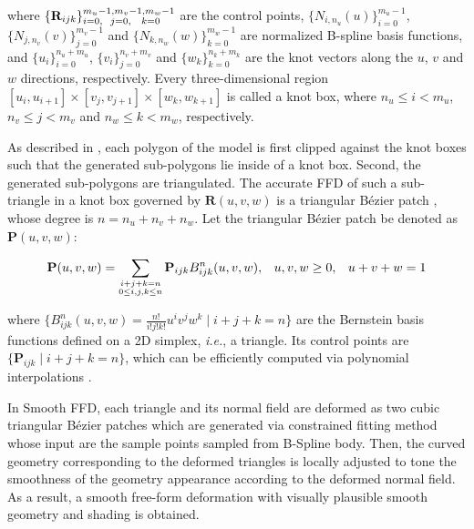 \documentclass[3p]{elsarticle}
\begin{document}
\noindent where $\{\mathbf R_{ijk}\}_{i=0,\hspace{6 pt} j=0,\hspace{8 pt} k=0}^{m_u-1,m_v-1,m_w-1}$ are the control
points, $\{N_{i,n_u}(u)\}_{i=0}^{m_u-1}$, $\{N_{j,n_v}(v)\}_{j=0}^{m_v-1}$ and $\{N_{k,n_w}(w)\}_{k=0}^{m_w-1}$ are
normalized B-spline basis functions, and $\{u_i\}^{n_u+m_u}_{i=0}$, $\{v_i\}^{n_v+m_v}_{j=0}$ and
$\{w_k\}^{n_k+m_k}_{k=0}$ are the knot vectors along the $u$, $v$ and $w$ directions, respectively. Every
three-dimensional region $[u_i, u_{i+1}] \times [v_j, v_{j+1}] \times [w_k, w_{k+1}]$ is called a knot box, where
$n_u\leq i < m_u$, $n_v\leq j < m_v$ and $n_w\leq k < m_w$, respectively.

As described in \cite{Feng98, Feng00, Cui14}, each polygon of the model is first clipped against the knot boxes such
that the generated sub-polygons lie inside of a knot box. Second, the generated sub-polygons are triangulated. The
accurate FFD of such a sub-triangle in a knot box governed by $\mathbf R(u,v,w)$ is a triangular B\'ezier patch
\cite{Feng98, Feng00}, whose degree is $n=n_u+n_v+n_w$. Let the triangular B\'ezier patch be denoted as ${\mathbf
P}(u,v,w)$:

\begin{equation}
	\footnotesize
	{\mathbf P}(u,v,w)
	= \sum_{\substack{i+j+k=n \\ 0\leq i,j,k\leq n}} {\mathbf P}_{ijk}B^n_{ijk}(u,v,w), \hspace{8 pt} u,v,w\ge0,
		\hspace{8 pt}u+v+w=1
	\label{equ:Puvw}
\end{equation}

\noindent where $\{B_{ijk}^n(u,v,w)=\frac{n!}{i!j!k!}u^iv^jw^k \mid i+j+k=n\}$ are the Bernstein basis functions
defined on a 2D simplex, \textit{i.e.}, a triangle. Its control points are $\{\mathbf P_{ijk} \mid i+j+k=n\}$, which
can be efficiently computed via polynomial interpolations \cite{Feng00}.

In Smooth FFD, each triangle and its normal field are deformed as two cubic triangular Bézier patches which are generated via constrained fitting method whose input are the sample points  sampled from B-Spline body. Then, the curved geometry corresponding to the deformed triangles is locally adjusted to tone the smoothness of the geometry appearance according to the deformed normal field. As a result, a smooth free-form deformation with visually plausible smooth geometry and shading is obtained.
\end{document}
